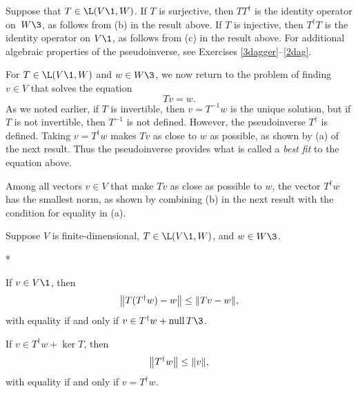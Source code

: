 
Suppose that $T \in \L(V\1, W)$. If $T$ is surjective, then $TT^\dagger$ is the identity operator on~$W\3$, as follows from (b) in the result above. If $T$ is injective, then $T^\dagger T$ is the identity operator on $V\1$, as follows from (c) in the result above. For additional algebraic properties of the pseudoinverse, see Exercises \ref{3dagger}--\ref{2dag}.

\pagebreak[3]

For $T \in \L(V\1,W)$ and $w \in W\3$, we now return to the problem of finding $v \in V$ that solves the equation
\[
Tv = w.
\]
As we noted earlier, if $T$ is invertible, then $v = T^{-1}w$ is the unique solution, but if $T$ is not invertible, then $T^{-1}$ is not defined. However, the pseudoinverse $T^\dagger$ is defined. Taking $v = T^\dagger w$ makes $Tv$ as close to $w$ as possible, as shown by (a) of the next result. Thus the pseudoinverse provides what is called a \textit{best fit} to the equation above.

Among all vectors $v \in V$ that make $Tv$ as close as possible to $w$, the vector $T^\dagger w$ has the smallest norm, as shown by combining (b) in the next result with the condition for equality in (a).

{Suppose $V$ is finite-dimensional, $T \in \L(V\1,W)$, and $w \in W\3$.
\begin{subtheorem}*
\item
If $v \in V\1$, then
\[
\norm[\big]{ T(T^\dagger w) - w } \le \norm{Tv - w},
\]
with equality if and only if $v \in T^\dagger w + \ker T\3$.
\item
If $v \in T^\dagger w + \ker T$, then
\[
\norm[\big]{T^\dagger w} \le \norm{v},
\]
with equality if and only if $v = T^\dagger w$.
\end{subtheorem}}

